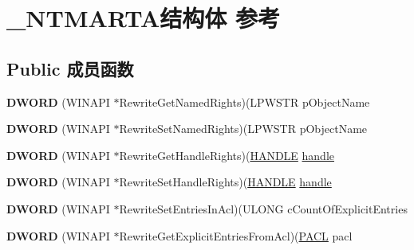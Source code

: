 \hypertarget{struct___n_t_m_a_r_t_a}{}\section{\+\_\+\+N\+T\+M\+A\+R\+T\+A结构体 参考}
\label{struct___n_t_m_a_r_t_a}
\subsection*{Public 成员函数}
\begin{DoxyCompactItemize}
\item 
\mbox{\label{struct___n_t_m_a_r_t_a_a65266d95fd507f9ab974c27a6c5d4d34}} 
{\bfseries D\+W\+O\+RD} (W\+I\+N\+A\+PI $\ast$Rewrite\+Get\+Named\+Rights)(L\+P\+W\+S\+TR p\+Object\+Name
\item 
\mbox{\label{struct___n_t_m_a_r_t_a_a3bd2320e6811723437e5d19e8fdf632f}} 
{\bfseries D\+W\+O\+RD} (W\+I\+N\+A\+PI $\ast$Rewrite\+Set\+Named\+Rights)(L\+P\+W\+S\+TR p\+Object\+Name
\item 
\mbox{\label{struct___n_t_m_a_r_t_a_afbe009d3eb59d5b2447304d1fe2af82a}} 
{\bfseries D\+W\+O\+RD} (W\+I\+N\+A\+PI $\ast$Rewrite\+Get\+Handle\+Rights)(\hyperlink{interfacevoid}{H\+A\+N\+D\+LE} \hyperlink{structhandle}{handle}
\item 
\mbox{\label{struct___n_t_m_a_r_t_a_ac8153dbe624d9363ef4610bada208b27}} 
{\bfseries D\+W\+O\+RD} (W\+I\+N\+A\+PI $\ast$Rewrite\+Set\+Handle\+Rights)(\hyperlink{interfacevoid}{H\+A\+N\+D\+LE} \hyperlink{structhandle}{handle}
\item 
\mbox{\label{struct___n_t_m_a_r_t_a_aac8374b4dfe4a2d2e269567e083ad070}} 
{\bfseries D\+W\+O\+RD} (W\+I\+N\+A\+PI $\ast$Rewrite\+Set\+Entries\+In\+Acl)(U\+L\+O\+NG c\+Count\+Of\+Explicit\+Entries
\item 
\mbox{\label{struct___n_t_m_a_r_t_a_acd2c1cbcea31dc36319626cb45f79586}} 
{\bfseries D\+W\+O\+RD} (W\+I\+N\+A\+PI $\ast$Rewrite\+Get\+Explicit\+Entries\+From\+Acl)(\hyperlink{struct___a_c_l}{P\+A\+CL} pacl
\item 
\mbox{\label{struct___n_t_m_a_r_t_a_a2f3c96515b1acdea57dbfd71b10ba9e3}} 

\end{DoxyCompactItemize}

